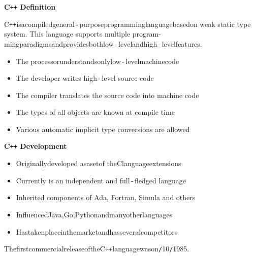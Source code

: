 \documentclass{beamer}
\begin{document}
\begin{frame}{\bf C\texttt{++} Definition}

    \begin{block}
    \justifying C\texttt{++}\;is\;a\;compiled\:general\,-\,purpose\:programming\:language\;based\:on weak static type system. This language supports multiple program- ming\:paradigms\:and\:provides\:both\:low\,-\,level\:and\:high\,-\,level\:features.
    \end{block}

    \begin{itemize}

        \item The processor\;understands\;only\;low\,-\,level\;machine\;code

        \item The developer writes high\,-\,level source code

        \item The compiler translates the source code into machine code

        \item The types of all objects are known at compile time

        \item Various automatic implicit type conversions are allowed
        
    \end{itemize}
    
\end{frame}

\begin{frame}{\bf C\texttt{++} Development}
    
    \begin{itemize}

        \item Originally\;developed as\;a\;set\;of the\;C\;language\;extensions

        \item Currently is an independent and full\,-\,fledged language

        \item Inherited components of Ada, Fortran, Simula and others

        \item Influenced\;Java,\:Go,\:Python\;and\;many\;other\;languages

        \item Has\;taken\;place\;in\;the\;market\;and\;has\;several\;competitors
         
    \end{itemize}

    \begin{block}
    \justifying The\:first\:commercial\:release\:of\:the\:C\texttt{++}\:language\:was\:on\texttt{/}10\texttt{/}1985.
    \end{block}
    
\end{frame}
\end{document}
